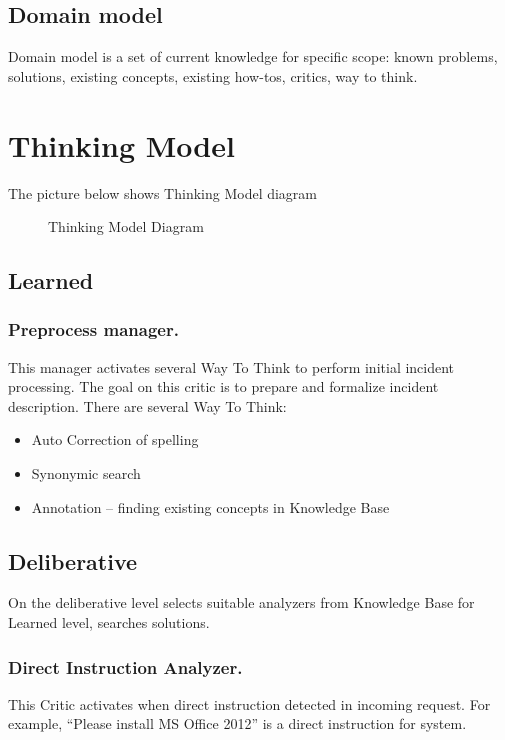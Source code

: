 \documentclass[runningheads,a4paper]{llncs}
\begin{document}
\subsection{Domain model}
Domain model is a set of current knowledge for specific scope: known problems, solutions, existing concepts, existing how-tos, critics, way to think.\\

\section{Thinking Model}
The picture below shows Thinking Model diagram

\begin{figure}


\caption{Thinking Model Diagram}
\end{figure}

\subsection{Learned}

\subsubsection{Preprocess manager.} This manager activates several Way To Think to perform initial incident processing. The goal on this critic is to prepare and formalize incident description. There are several Way To Think:
\begin{itemize}
 \item Auto Correction of spelling
 \item Synonymic search
 \item Annotation – finding existing concepts in Knowledge Base
\end{itemize}

\subsection{Deliberative}

On the deliberative level selects suitable analyzers from Knowledge Base for Learned level, searches solutions.

\subsubsection{Direct Instruction Analyzer.} This Critic activates when direct instruction detected in incoming request. For example, “Please install MS Office 2012” is a direct instruction for system.
\end{document}
